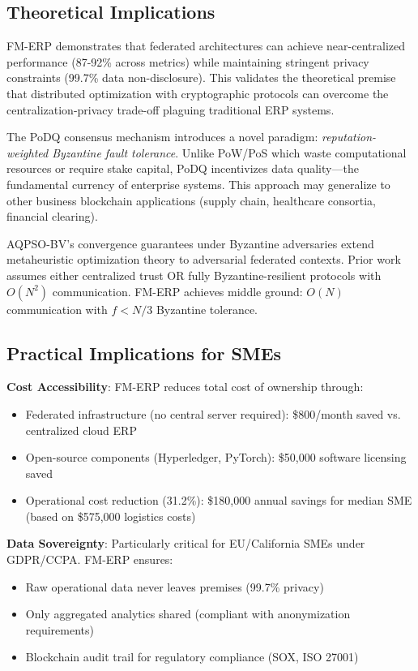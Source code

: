 \documentclass[times,10pt,twocolumn]{jucs2e}
\begin{document}
\subsection{Theoretical Implications}

FM-ERP demonstrates that federated architectures can achieve near-centralized performance (87-92\% across metrics) while maintaining stringent privacy constraints (99.7\% data non-disclosure). This validates the theoretical premise that distributed optimization with cryptographic protocols can overcome the centralization-privacy trade-off plaguing traditional ERP systems.

The PoDQ consensus mechanism introduces a novel paradigm: \textit{reputation-weighted Byzantine fault tolerance}. Unlike PoW/PoS which waste computational resources or require stake capital, PoDQ incentivizes data quality---the fundamental currency of enterprise systems. This approach may generalize to other business blockchain applications (supply chain, healthcare consortia, financial clearing).

AQPSO-BV's convergence guarantees under Byzantine adversaries extend metaheuristic optimization theory to adversarial federated contexts. Prior work assumes either centralized trust OR fully Byzantine-resilient protocols with $O(N^2)$ communication. FM-ERP achieves middle ground: $O(N)$ communication with $f < N/3$ Byzantine tolerance.

\subsection{Practical Implications for SMEs}

\textbf{Cost Accessibility}: FM-ERP reduces total cost of ownership through:
\begin{itemize}
\item Federated infrastructure (no central server required): \$800/month saved vs. centralized cloud ERP
\item Open-source components (Hyperledger, PyTorch): \$50,000 software licensing saved
\item Operational cost reduction (31.2\%): \$180,000 annual savings for median SME (based on \$575,000 logistics costs)
\end{itemize}

\textbf{Data Sovereignty}: Particularly critical for EU/California SMEs under GDPR/CCPA. FM-ERP ensures:
\begin{itemize}
\item Raw operational data never leaves premises (99.7\% privacy)
\item Only aggregated analytics shared (compliant with anonymization requirements)
\item Blockchain audit trail for regulatory compliance (SOX, ISO 27001)
\end{itemize}
\end{document}
